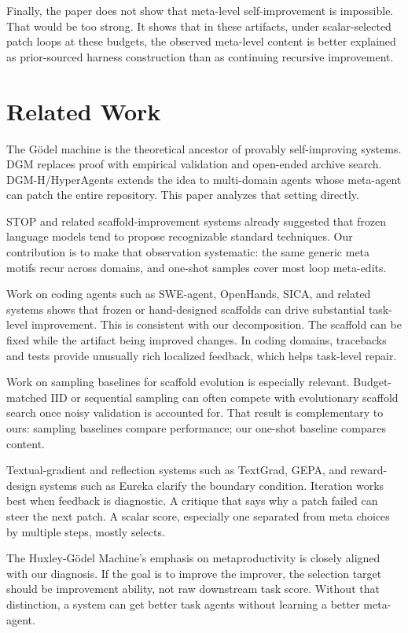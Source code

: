 \documentclass[11pt]{article}
\begin{document}
Finally, the paper does not show that meta-level self-improvement is impossible. That would be too strong. It shows that in these artifacts, under scalar-selected patch loops at these budgets, the observed meta-level content is better explained as prior-sourced harness construction than as continuing recursive improvement.

\section{Related Work}\label{related-work}

The Gödel machine is the theoretical ancestor of provably self-improving systems. DGM replaces proof with empirical validation and open-ended archive search. DGM-H/\allowbreak HyperAgents extends the idea to multi-domain agents whose meta-agent can patch the entire repository. This paper analyzes that setting directly.

STOP and related scaffold-improvement systems already suggested that frozen language models tend to propose recognizable standard techniques. Our contribution is to make that observation systematic: the same generic meta motifs recur across domains, and one-shot samples cover most loop meta-edits.

Work on coding agents such as SWE-agent, OpenHands, SICA, and related systems shows that frozen or hand-designed scaffolds can drive substantial task-level improvement. This is consistent with our decomposition. The scaffold can be fixed while the artifact being improved changes. In coding domains, tracebacks and tests provide unusually rich localized feedback, which helps task-level repair.

Work on sampling baselines for scaffold evolution is especially relevant. Budget-matched IID or sequential sampling can often compete with evolutionary scaffold search once noisy validation is accounted for. That result is complementary to ours: sampling baselines compare performance; our one-shot baseline compares content.

Textual-gradient and reflection systems such as TextGrad, GEPA, and reward-design systems such as Eureka clarify the boundary condition. Iteration works best when feedback is diagnostic. A critique that says why a patch failed can steer the next patch. A scalar score, especially one separated from meta choices by multiple steps, mostly selects.

The Huxley-Gödel Machine's emphasis on metaproductivity is closely aligned with our diagnosis. If the goal is to improve the improver, the selection target should be improvement ability, not raw downstream task score. Without that distinction, a system can get better task agents without learning a better meta-agent.
\end{document}
